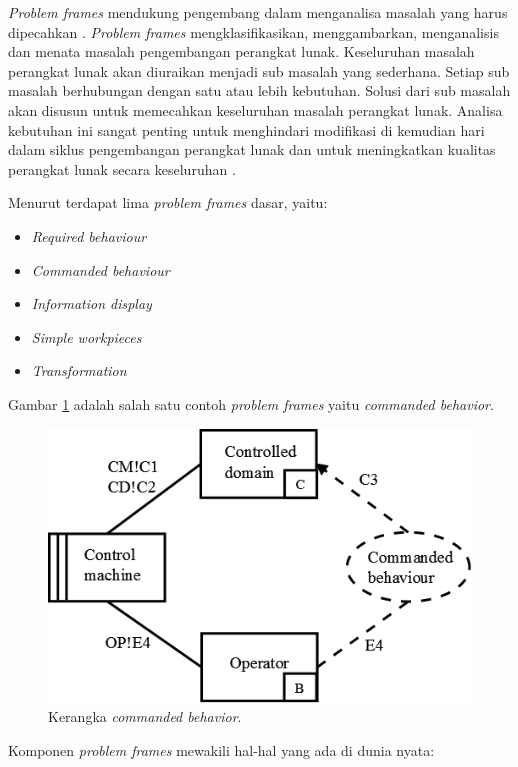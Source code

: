 \textit{Problem frames} mendukung pengembang dalam menganalisa masalah yang harus dipecahkan \citep{beckers2014}. \textit{Problem frames} mengklasifikasikan, menggambarkan, menganalisis dan menata masalah pengembangan perangkat lunak.  Keseluruhan masalah perangkat lunak akan diuraikan menjadi sub masalah yang sederhana. Setiap sub masalah berhubungan dengan satu atau lebih kebutuhan. Solusi dari sub masalah akan disusun untuk memecahkan keseluruhan masalah perangkat lunak. Analisa kebutuhan ini sangat penting untuk menghindari modifikasi di kemudian hari dalam siklus pengembangan perangkat lunak dan untuk meningkatkan kualitas perangkat lunak secara keseluruhan \citep{alebrahim2014}. 

Menurut \citep{jackson2001} terdapat lima \textit{problem frames} dasar, yaitu:

\begin{itemize}
	\item \textit{Required behaviour}
	\item \textit{Commanded behaviour}
	\item \textit{Information display}
	\item \textit{Simple workpieces}
	\item \textit{Transformation}
\end{itemize}

Gambar \ref{pf} adalah salah satu contoh \textit{problem frames} yaitu \textit{commanded behavior}.

\begin{figure}[H]
	\centering
	\includegraphics[scale=0.4]{gambar/pf}
	\caption{Kerangka \textit{commanded behavior}. }
	\label{pf}
\end{figure}

Komponen \textit{problem frames} mewakili hal-hal yang ada di dunia nyata:

